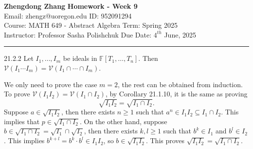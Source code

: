\documentclass[letterpaper, 12pt]{article}
\begin{document}
\noindent
\large\textbf{Zhengdong Zhang} \hfill \textbf{Homework - Week 9} \\
Email: zhengz@uoregon.edu \hfill ID: 952091294 \\
\normalsize Course: MATH 649 - Abstract Algebra \hfill Term: Spring 2025 \\
Instructor: Professor Sasha Polishchuk \hfill Due Date: $4^{th}$ June, 2025 \\
\noindent\rule{7in}{2.8pt}
\begin{problem}{21.2.2}
Let \(I_1,\ldots,I_m\) be ideals in \(\mathbb{F}[T_1,\ldots,T_n]\). Then \(\mathcal{V}(I_1\cdots I_m)=\mathcal{V}(I_1\cap\cdots\cap I_m)\).
\end{problem}
\begin{solution}
We only need to prove the case \(m=2\), the rest can be obtained from induction. To prove \(\mathcal{V}(I_1I_2)=\mathcal{V}(I_1\cap I_2)\), by Corollary 21.1.10, it is the same as proving 
\[\sqrt{I_1I_2}=\sqrt{I_1\cap I_2}.\]
Suppose \(a\in \sqrt{I_1I_2}\), then there exists \(n\geq 1\) such that \(a^n\in I_1I_2\subseteq I_1\cap I_2\). This implies that \(p\in \sqrt{I_1\cap I_2}\). On the other hand, suppose \(b\in \sqrt{I_1\cap I_2}=\sqrt{I_1}\cap \sqrt{I_2}\), then there exists \(k,l\geq 1\) such that \(b^k\in I_1\) and \(b^l\in I_2\). This implies \(b^{k+l}=b^k\cdot b^l\in I_1I_2\), so \(b\in \sqrt{I_1I_2}\). This proves \(\sqrt{I_1I_2}=\sqrt{I_1\cap I_2}\). 
\end{solution}
\end{document}
